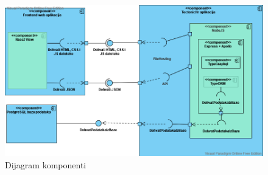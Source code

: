 		\begin{figure}[H]
	\includegraphics[width=\textwidth]{slike/dijagramkomponenti.png}
	\caption{Dijagram komponenti}
	\label{fig:uml_db} 
\end{figure}

		\eject